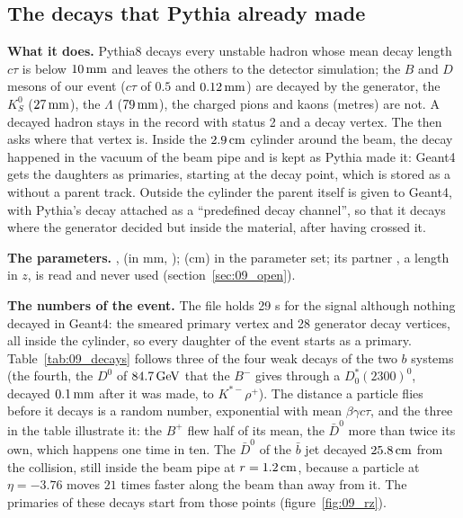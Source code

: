 \subsection{The decays that Pythia already made}
\label{sec:09_decays}

\textbf{What it does.} Pythia8 decays every unstable hadron whose mean decay length $c\tau$ is below $10\,\mathrm{mm}$ and
leaves the others to the detector simulation; the $B$ and $D$ mesons of our event ($c\tau$ of $0.5$ and
$0.12\,\mathrm{mm}$) are decayed by the generator, the $K^0_S$ ($27\,\mathrm{mm}$), the $\Lambda$ ($79\,\mathrm{mm}$), the charged pions and
kaons (metres) are not. A decayed hadron stays in the record with status 2 and a decay vertex. The
 then asks where that vertex is. Inside the $2.9\,\mathrm{cm}$ cylinder around the beam, the decay
happened in the vacuum of the beam pipe and is kept as Pythia made it: Geant4 gets the daughters as primaries,
starting at the decay point, which is stored as a  without a parent track. Outside the cylinder the
parent itself is given to Geant4, with Pythia's decay attached as a ``predefined decay channel'', so that it decays
where the generator decided but inside the material, after having crossed it.

\textbf{The parameters.} ,  (in mm,
);  (cm) in the
 parameter set; its partner , a length in $z$, is read and never used
(section~\ref{sec:09_open}).

\textbf{The numbers of the event.} The file holds 29 s for the signal although nothing decayed in
Geant4: the smeared primary vertex and 28 generator decay vertices, all inside the cylinder, so every daughter of
the event starts as a primary. Table~\ref{tab:09_decays} follows three of the four weak decays of the two $b$
systems (the fourth, the $D^0$ of $84.7\,\mathrm{GeV}$ that the $B^-$ gives through a $D_0^*(2300)^0$, decayed $0.1\,\mathrm{mm}$ after
it was made, to $K^{*-}\rho^+$). The
distance a particle flies before it decays is a random number, exponential with mean $\beta\gamma c\tau$, and the
three in the table illustrate it: the $B^+$ flew half of its mean, the $\bar D^0$ more than twice its own, which
happens one time in ten. The $\bar D^0$ of the $\bar b$ jet decayed $25.8\,\mathrm{cm}$ from the collision, still inside the
beam pipe at $r = 1.2\,\mathrm{cm}$, because a particle at $\eta=-3.76$ moves $21$ times faster along the beam than away from
it. The primaries of these decays start from those points (figure~\ref{fig:09_rz}).

